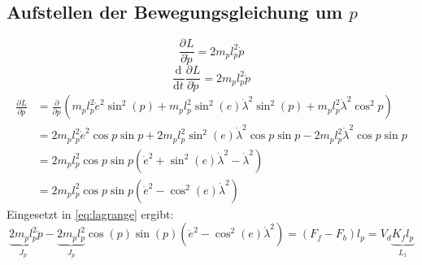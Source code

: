 \documentclass{article}
\newcommand{\partiell}[3][]{\frac{\partial^{#1}#2}{\partial{#3}^{#1}}}
\newcommand{\diff}[3][]{\frac{\mathrm{d}^{#1}#2}{\mathrm{d}{#3}^{#1}}}
\begin{document}
\subsection{Aufstellen der Bewegungsgleichung um $p$}
\begin{equation}
\partiell{L}{\dot{p}} = 2m_p l_p^2 \dot{p}
\end{equation}
\begin{equation}
\diff{}{t} \partiell{L}{\dot{p}} = 2m_p l_p^2 \ddot{p}
\end{equation}
\begin{equation}
\begin{split}
\partiell{L}{p} &= \partiell{}{p} (m_p l_p^2 \dot{e}^2 \sin^2 (p) 
+ m_p l_p^2 \sin^2 (e) \dot{\lambda}^2 \sin^2 (p)
+ m_p l_p^2 \dot{\lambda}^2 \cos^2 p)\\
&= 2 m_p l_p^2 \dot{e}^2 \cos p \sin p + 2 m_p l_p^2 \sin^2 (e) \dot{\lambda}^2 \cos p \sin p 
- 2 m_p l_p^2 \dot{\lambda}^2 \cos p \sin p\\
&= 2 m_p l_p^2 \cos p \sin p (\dot{e}^2+ \sin^2 (e) \dot{\lambda}^2- \dot{\lambda}^2)\\
&= 2 m_p l_p^2 \cos p \sin p (\dot{e}^2- \cos^2 (e) \dot{\lambda}^2)
\end{split}
\end{equation}
Eingesetzt in \eqref{eq:lagrange} ergibt:
\begin{equation}
\underbrace{2m_p l_p^2}_{J_p} \ddot{p} -  \underbrace{2 m_p l_p^2}_{J_p} \cos (p) \sin (p) (\dot{e}^2- \cos^2 (e) \dot{\lambda}^2) = (F_f - F_b)l_p = V_d \underbrace{K_f l_p}_{L_1}
\end{equation}
\end{document}
